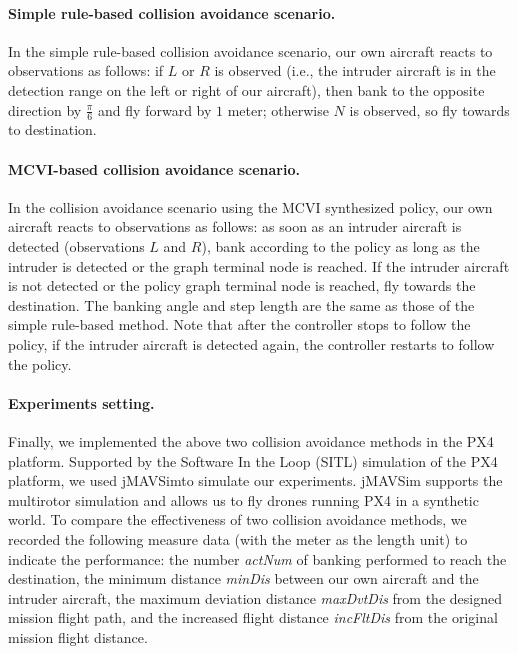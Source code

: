 \documentclass{article}
\newcommand{\jMAVSim}{\textsf{jMAVSim}}
\begin{document}
\paragraph*{Simple rule-based collision avoidance scenario.}
In the simple rule-based collision avoidance scenario, our own aircraft reacts to observations as follows:
if $L$ or $R$ is observed (i.e., the intruder aircraft is in the detection range on the left or right of our aircraft), then bank to the opposite direction by $\frac{\pi}{6}$ and fly forward by $1$ meter;
otherwise $N$ is observed, so fly towards to destination.

\paragraph*{MCVI-based collision avoidance scenario.}
In the collision avoidance scenario using the MCVI synthesized policy, our own aircraft reacts to observations as follows:
as soon as an intruder aircraft is detected (observations $L$ and $R$), bank according to the policy as long as the intruder is detected or the graph terminal node is reached.
If the intruder aircraft is not detected or the policy graph terminal node is reached, fly towards the destination.
The banking angle and step length are the same as those of the simple rule-based method.
Note that after the controller stops to follow the policy, if the intruder aircraft is detected again, the controller restarts to follow the policy. 

\paragraph*{Experiments setting.}
Finally, we implemented the above two collision avoidance methods in the PX4 platform.
Supported by the \textsf{Software In the Loop} (SITL) simulation of the PX4 platform, we used \jMAVSim to  simulate our experiments. 
\jMAVSim{} supports the multirotor simulation and allows us to fly drones running PX4 in a synthetic world. 
To compare the effectiveness of two collision avoidance methods, we recorded the following measure data (with the meter as the length unit) to indicate the performance:
the number \emph{actNum} of banking performed to reach the destination,
the minimum distance \emph{minDis} between our own aircraft and the intruder aircraft,
the maximum deviation distance \emph{maxDvtDis} from the designed mission flight path, and
the increased flight distance \emph{incFltDis} from the original mission flight distance.
\end{document}
